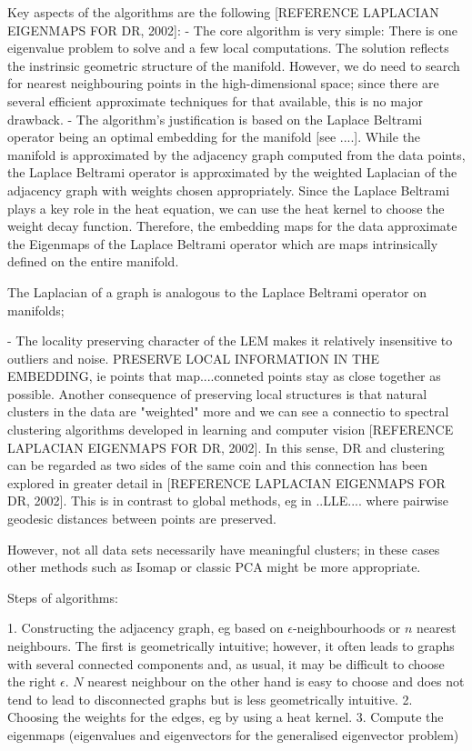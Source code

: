 \documentclass[journal, a4paper]{IEEEtran}
\begin{document}
Key aspects of the algorithms are the following [REFERENCE LAPLACIAN EIGENMAPS FOR DR, 2002]:
- The core algorithm is very simple: There is one eigenvalue problem to solve and a few local computations. The solution reflects the instrinsic geometric structure of the manifold. However, we do need to search for nearest neighbouring points in the high-dimensional space; since there are several efficient approximate techniques for that available, this is no major drawback.
- The algorithm's justification is based on the Laplace Beltrami operator being an optimal embedding for the manifold [see ....]. 
While the manifold is approximated by the adjacency graph computed from the data points, the Laplace Beltrami operator is approximated by the weighted Laplacian of the adjacency graph with weights chosen appropriately. %
Since the Laplace Beltrami plays a key role in the heat equation, we can use the heat kernel to choose the weight decay function. Therefore, the embedding maps for the data approximate the Eigenmaps of the Laplace Beltrami operator which are maps intrinsically defined on the entire manifold.

The Laplacian of a graph is analogous to the Laplace Beltrami operator on manifolds; 

- The locality preserving character of the LEM makes it relatively insensitive to outliers and noise. 
PRESERVE LOCAL INFORMATION IN THE EMBEDDING, ie points that map....conneted points stay as close together as possible.
Another consequence of preserving local structures  is that natural clusters in the data are "weighted" more and we can see a connectio to spectral clustering algorithms developed in learning and computer vision [REFERENCE LAPLACIAN EIGENMAPS FOR DR, 2002].
In this sense, DR and clustering can be regarded as two sides of the same coin and this connection has been explored in greater detail in [REFERENCE LAPLACIAN EIGENMAPS FOR DR, 2002]. 
This is in contrast to global methods, eg in ..LLE.... where pairwise geodesic distances between points are preserved.


However, not all data sets necessarily have meaningful clusters; in these cases other methods such as Isomap or classic PCA might be more appropriate. 

Steps of algorithms:

1. Constructing the adjacency graph, eg based on \( \epsilon \)-neighbourhoods or \( n \) nearest neighbours.
The first is geometrically intuitive; however, it often leads to graphs with several connected components and, as usual, it may be difficult to choose the right \( \epsilon \). \( N \) nearest neighbour on the other hand is easy to choose and does not tend to lead to disconnected graphs but is less geometrically intuitive.
2. Choosing the weights for the edges, eg by using a heat kernel.
3. Compute the eigenmaps (eigenvalues and eigenvectors for the generalised eigenvector problem)
\end{document}
